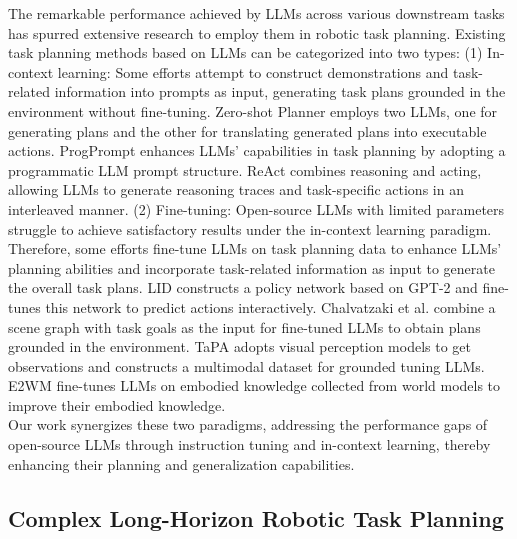 The remarkable performance achieved by LLMs across various downstream tasks has spurred extensive research to employ them in robotic task planning. Existing task planning methods based on LLMs can be categorized into two types: (1) In-context learning: Some efforts attempt to construct demonstrations and task-related information into prompts as input, generating task plans grounded in the environment without fine-tuning. Zero-shot Planner \cite{DBLP:conf/icml/HuangAPM22} employs two LLMs, one for generating plans and the other for translating generated plans into executable actions. ProgPrompt \cite{DBLP:conf/icra/SinghBMGXTFTG23} enhances LLMs' capabilities in task planning by adopting a programmatic LLM prompt structure. ReAct \cite{DBLP:conf/iclr/YaoZYDSN023} combines reasoning and acting, allowing LLMs to generate reasoning traces and task-specific actions in an interleaved manner. (2) Fine-tuning: Open-source LLMs with limited parameters struggle to achieve satisfactory results under the in-context learning paradigm. Therefore, some efforts fine-tune LLMs on task planning data to enhance LLMs' planning abilities and incorporate task-related information as input to generate the overall task plans. LID \cite{DBLP:conf/nips/LiPPDWF0HAAAM0Z22} constructs a policy network based on GPT-2 and fine-tunes this network to predict actions interactively. Chalvatzaki et al. \cite{chalvatzaki2023learning} combine a scene graph with task goals as the input for fine-tuned LLMs to obtain plans grounded in the environment. TaPA \cite{DBLP:journals/corr/abs-2307-01848} adopts visual perception models to get observations and constructs a multimodal dataset for grounded tuning LLMs. E2WM \cite{DBLP:journals/corr/abs-2305-10626} fine-tunes LLMs on embodied knowledge collected from world models to improve their embodied knowledge.\\
\indent Our work synergizes these two paradigms, addressing the performance gaps of open-source LLMs through instruction tuning and in-context learning, thereby enhancing their planning and generalization capabilities.

\subsection{Complex Long-Horizon Robotic Task Planning}

